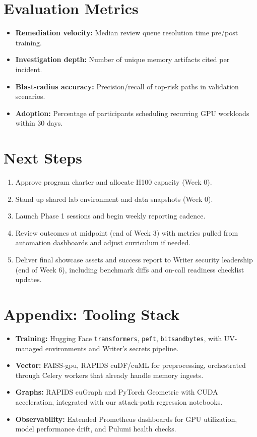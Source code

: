 \documentclass[11pt]{scrartcl}
\begin{document}
\section{Evaluation Metrics}
\begin{itemize}
  \item \textbf{Remediation velocity:} Median review queue resolution time pre/post training.
  \item \textbf{Investigation depth:} Number of unique memory artifacts cited per incident.
  \item \textbf{Blast-radius accuracy:} Precision/recall of top-risk paths in validation scenarios.
  \item \textbf{Adoption:} Percentage of participants scheduling recurring GPU workloads within 30 days.
\end{itemize}

\section{Next Steps}
\begin{enumerate}
  \item Approve program charter and allocate H100 capacity (Week 0).
  \item Stand up shared lab environment and data snapshots (Week 0).
  \item Launch Phase 1 sessions and begin weekly reporting cadence.
  \item Review outcomes at midpoint (end of Week 3) with metrics pulled from automation dashboards and adjust curriculum if needed.
  \item Deliver final showcase assets and success report to Writer security leadership (end of Week 6), including benchmark diffs and on-call readiness checklist updates.
\end{enumerate}

\section*{Appendix: Tooling Stack}
\begin{itemize}
  \item \textbf{Training:} Hugging Face \texttt{transformers}, \texttt{peft}, \texttt{bitsandbytes}, with UV-managed environments and Writer's secrets pipeline.
  \item \textbf{Vector:} FAISS-gpu, RAPIDS cuDF/cuML for preprocessing, orchestrated through Celery workers that already handle memory ingests.
  \item \textbf{Graphs:} RAPIDS cuGraph and PyTorch Geometric with CUDA acceleration, integrated with our attack-path regression notebooks.
  \item \textbf{Observability:} Extended Prometheus dashboards for GPU utilization, model performance drift, and Pulumi health checks.
\end{itemize}
\end{document}
